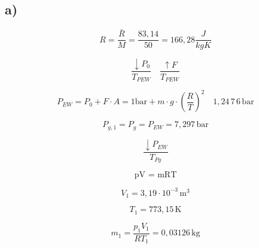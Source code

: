 

\subsection*{a)}

\[
R = \frac{\bar{R}}{M} = \frac{83,14}{50} = 166,28 \frac{J}{kgK}
\]

\[
\frac{\downarrow P_0}{T_{PEW}} \quad \frac{\uparrow F}{T_{PEW}}
\]

\[
P_{EW} = P_0 + F \cdot A = 1 \text{bar} + m \cdot g \cdot \left( \frac{R}{T} \right)^2 \quad 1,24 \, 7 \, 6 \, \text{bar}
\]

\[
P_{g,1} = P_{g} = P_{EW} = 7,297 \, \text{bar}
\]

\[
\frac{\downarrow P_{EW}}{T_{Pg}}
\]

\[
\text{pV = mRT}
\]

\[
V_1 = 3,19 \cdot 10^{-3} \, \text{m}^3
\]

\[
T_1 = 773,15 \, \text{K}
\]

\[
m_1 = \frac{p_1 V_1}{R T_1} = 0,03126 \, \text{kg}
\]